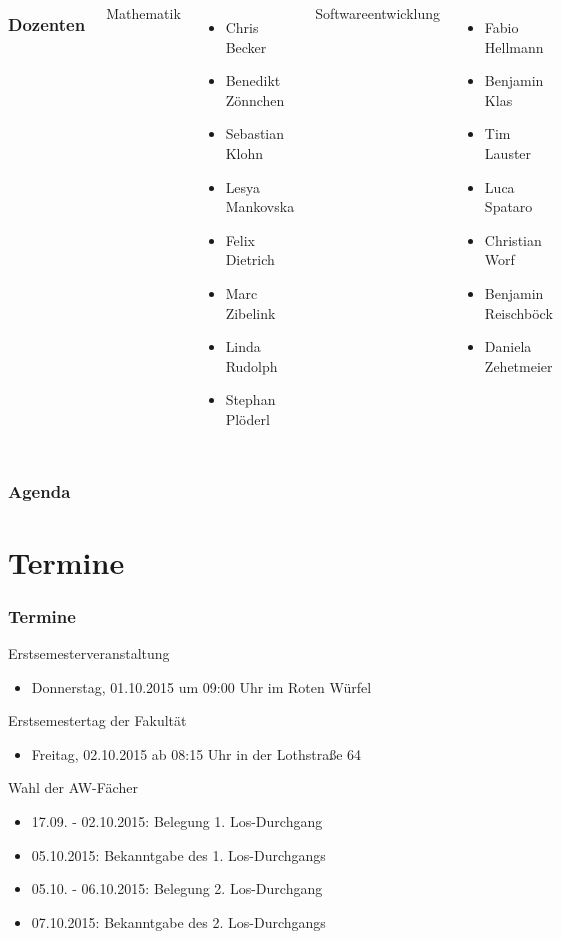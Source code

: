 \documentclass{beamer}
\begin{document}
	\begin{frame}
		\begin{columns}[t]
			\frametitle{Dozenten}
			Mathematik
			\begin{itemize}
				\item Chris Becker
				\item Benedikt Zönnchen
				\item Sebastian Klohn
				\item Lesya Mankovska
				\item Felix Dietrich
				\item Marc Zibelink
				\item Linda Rudolph
				\item Stephan Plöderl
			\end{itemize}
			Softwareentwicklung
			\begin{itemize}
				\item Fabio Hellmann
				\item Benjamin Klas
				\item Tim Lauster
				\item Luca Spataro
				\item Christian Worf
				\item Benjamin Reischböck
				\item Daniela Zehetmeier
			\end{itemize}
		\end{columns}
	\end{frame}
	
	\begin{frame}
		\frametitle{Agenda}
		\tableofcontents
	\end{frame}
	
	\section{Termine}
	\begin{frame}
		\frametitle{Termine}
		Erstsemesterveranstaltung
		\begin{itemize}
			\item Donnerstag, 01.10.2015 um 09:00 Uhr im Roten Würfel
		\end{itemize}
		\pause
		Erstsemestertag der Fakultät
		\begin{itemize}
			\item Freitag, 02.10.2015 ab 08:15 Uhr in der Lothstraße 64
		\end{itemize}
		\pause
		Wahl der AW-Fächer
		\begin{itemize}
			\item 17.09. - 02.10.2015: Belegung 1. Los-Durchgang
			\item 05.10.2015: Bekanntgabe des 1. Los-Durchgangs
			\item 05.10. - 06.10.2015: Belegung 2. Los-Durchgang
			\item 07.10.2015: Bekanntgabe des 2. Los-Durchgangs
		\end{itemize}
	\end{frame}
	
\end{document}
